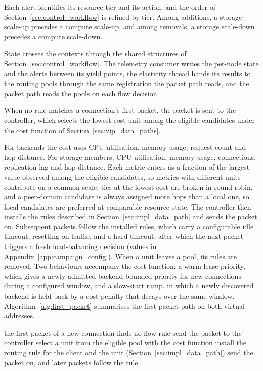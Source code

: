 ﻿\documentclass[12pt,reqno,twoside]{amsbook}
\begin{document}
Each alert identifies its resource tier and its action, and the order of
Section~\ref{sec:control_workflow} is refined by tier. Among additions, a
storage scale-up precedes a compute scale-up, and among removals, a storage
scale-down precedes a compute scale-down.

State crosses the contexts through the shared structures of
Section~\ref{sec:control_workflow}. The telemetry consumer writes the
per-node state and the alerts between its yield points, the elasticity
thread hands its results to the routing pools through the same
registration the packet path reads, and the packet path reads the pools
on each flow decision.

When no rule matches a connection's first packet, the packet is sent to the
controller, which selects the lowest-cost unit among the eligible candidates
under the cost function of Section~\ref{sec:vip_data_paths}.

For backends the cost uses CPU utilisation, memory usage, request count and
hop distance. For storage members, CPU utilisation, memory usage, connections,
replication lag and hop distance. Each metric enters as a fraction of the
largest value observed among the eligible candidates, so metrics with
different units contribute on a common scale, ties at the lowest cost are
broken in round-robin, and a peer-domain candidate is always assigned more
hops than a local one, so local candidates are preferred at comparable
resource state. The controller then installs the rules
described in Section~\ref{sec:impl_data_path} and sends the packet
on. Subsequent packets follow the installed rules, which carry a configurable
idle timeout, resetting on traffic, and a hard timeout, after which the next
packet triggers a fresh load-balancing decision (values in
Appendix~\ref{app:campaign_config}). When a unit leaves a pool, its rules are
removed. Two behaviours accompany the cost
function: a warm-lease priority, which gives a newly admitted backend
bounded priority for new connections during a configured window, and a
slow-start ramp, in which a newly discovered backend is held back by a
cost penalty that decays over the same window.
Algorithm~\ref{alg:first_packet} summarises the first-packet path on both
virtual addresses.

\begin{algorithm}[H]
    \caption{First-packet handling for a new connection.}
    \label{alg:first_packet}
    \begin{algorithmic}[1]
        \State the first packet of a new connection finds no flow rule
        \State send the packet to the controller
        \State select a unit from the eligible pool with the cost function
        \State install the routing rule for the client and the unit
        (Section~\ref{sec:impl_data_path})
        \State send the packet on, and later packets follow the rule
    \end{algorithmic}
\end{algorithm}
\end{document}
